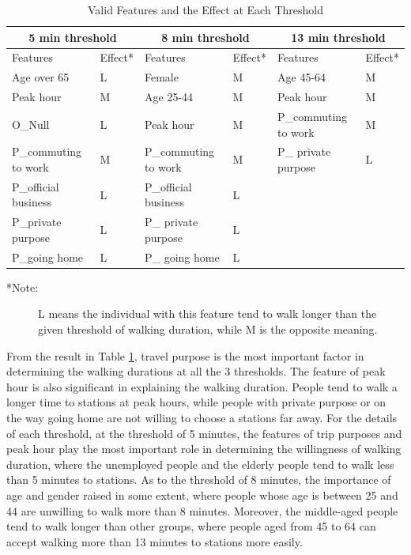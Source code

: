 \documentclass[sustainability,article,submit,moreauthors,pdftex,10pt,a4paper]{Definitions/mdpi}
\begin{document}
%
\begin{table}[h]
	\caption{Valid Features and the Effect at Each Threshold}
	\label{table:ValidFeatures}
	\centering
	\begin{tabular}{llllll}
		\toprule
		\multicolumn{2}{c}{5 min threshold} & \multicolumn{2}{c}{8 min threshold} & \multicolumn{2}{c}{13 min threshold} \\
		\midrule
		Features & Effect* & Features & Effect* & Features & Effect* \\
		Age over 65 & L	& Female & M & Age 45-64 & M \\
		Peak hour & M & Age 25-44 & M & Peak hour & M \\
		O\_Null	& L	& Peak hour	& M	& P\_commuting to work & M \\
		P\_commuting to work & M	& P\_commuting to work  & M	& P\_ private purpose & L \\
		P\_official business & L & P\_official business	& L	& & \\
		P\_private purpose & L & P\_ private purpose	& L & & \\
		P\_going home & L & P\_ going home & L & &   \\
		\bottomrule
	\end{tabular}
	\normalsize
	\begin{description}
		\item[*Note:] L means the individual with this feature tend to walk longer than the given threshold of walking duration, while M is the opposite meaning.
	\end{description}
\end{table}

%
From the result in Table \ref{table:ValidFeatures}, travel purpose is the most important factor in determining the walking durations at all the 3 thresholds. The feature of peak hour is also significant in explaining the walking duration. People tend to walk a longer time to stations at peak hours, while people with private purpose or on the way going home are not willing to choose a stations far away. For the details of each threshold, at the threshold of 5 minutes, the features of trip purposes and peak hour play the most important role in determining the willingness of walking duration, where the unemployed people and the elderly people tend to walk less than 5 minutes to stations. As to the threshold of 8 minutes, the importance of age and gender raised in some extent, where people whose age is between 25 and 44 are unwilling to walk more than 8 minutes. Moreover, the middle-aged people tend to walk longer than other groups, where people aged from 45 to 64 can accept walking more than 13 minutes to stations more easily. 
\end{document}
